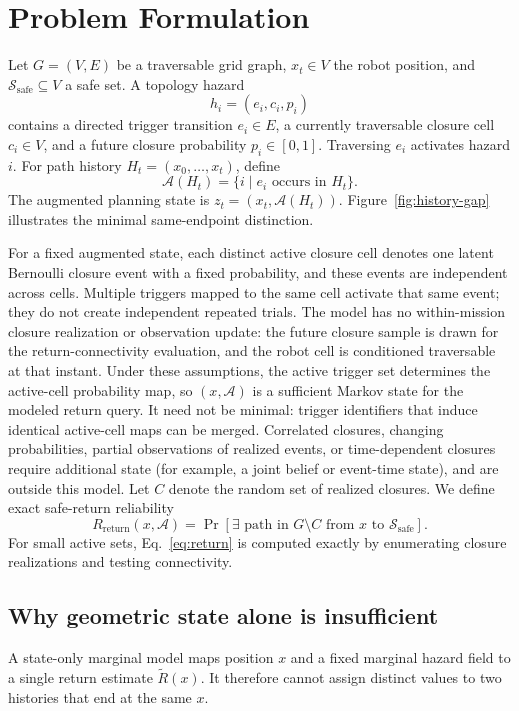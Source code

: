 \documentclass[conference]{IEEEtran}
\newcommand{\Rret}{R_{\mathrm{return}}}
\newcommand{\Aset}{\mathcal{A}}
\newcommand{\Ssafe}{\mathcal{S}_{\mathrm{safe}}}
\begin{document}
\section{Problem Formulation}
Let $G=(V,E)$ be a traversable grid graph, $x_t\in V$ the robot position, and $\Ssafe\subseteq V$ a safe set. A topology hazard
\begin{equation}
h_i=(e_i,c_i,p_i)
\end{equation}
contains a directed trigger transition $e_i\in E$, a currently traversable closure cell $c_i\in V$, and a future closure probability $p_i\in[0,1]$. Traversing $e_i$ activates hazard $i$. For path history $H_t=(x_0,\ldots,x_t)$, define
\begin{equation}
\Aset(H_t)=\{i\mid e_i\text{ occurs in }H_t\}.
\end{equation}
The augmented planning state is $z_t=(x_t,\Aset(H_t))$. Figure~\ref{fig:history-gap} illustrates the minimal same-endpoint distinction.

For a fixed augmented state, each distinct active closure cell denotes one latent Bernoulli closure event with a fixed probability, and these events are independent across cells. Multiple triggers mapped to the same cell activate that same event; they do not create independent repeated trials. The model has no within-mission closure realization or observation update: the future closure sample is drawn for the return-connectivity evaluation, and the robot cell is conditioned traversable at that instant. Under these assumptions, the active trigger set determines the active-cell probability map, so $(x,\Aset)$ is a sufficient Markov state for the modeled return query. It need not be minimal: trigger identifiers that induce identical active-cell maps can be merged. Correlated closures, changing probabilities, partial observations of realized events, or time-dependent closures require additional state (for example, a joint belief or event-time state), and are outside this model. Let $C$ denote the random set of realized closures. We define exact safe-return reliability
\begin{equation}
\Rret(x,\Aset)=
\Pr\!\left[\exists\text{ path in }G\setminus C\text{ from }x\text{ to }\Ssafe\right].
\label{eq:return}
\end{equation}
For small active sets, Eq.~\eqref{eq:return} is computed exactly by enumerating closure realizations and testing connectivity.

\subsection{Why geometric state alone is insufficient}
A state-only marginal model maps position $x$ and a fixed marginal hazard field to a single return estimate $\widetilde R(x)$. It therefore cannot assign distinct values to two histories that end at the same $x$.
\end{document}
